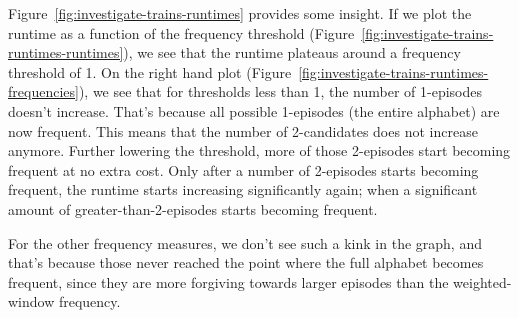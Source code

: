 Figure~\ref{fig:investigate-trains-runtimes} provides some insight. If we plot the runtime as a function of the frequency threshold (Figure~\ref{fig:investigate-trains-runtimes-runtimes}), we see that the runtime plateaus around a frequency threshold of 1. On the right hand plot (Figure~\ref{fig:investigate-trains-runtimes-frequencies}), we see that for thresholds less than 1, the number of 1-episodes doesn't increase. That's because all possible 1-episodes (the entire alphabet) are now frequent. This means that the number of 2-candidates does not increase anymore. Further lowering the threshold, more of those 2-episodes start becoming frequent at no extra cost. Only after a number of 2-episodes starts becoming frequent, the runtime starts increasing significantly again; when a significant amount of greater-than-2-episodes starts becoming frequent.

For the other frequency measures, we don't see such a kink in the graph, and that's because those never reached the point where the full alphabet becomes frequent, since they are more forgiving towards larger episodes than the weighted-window frequency.

